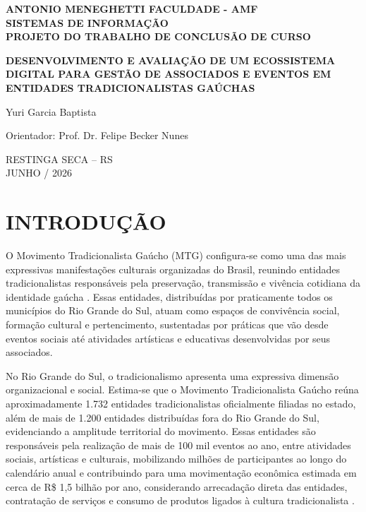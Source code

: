 ﻿\documentclass[12pt,a4paper]{article}
\begin{document}
\hypersetup{pageanchor=false}
\begin{titlepage}
    \begin{center}
        \textbf{ANTONIO MENEGHETTI FACULDADE - AMF}\\
        \textbf{SISTEMAS DE INFORMAÇÃO}\\
        \textbf{PROJETO DO TRABALHO DE CONCLUSÃO DE CURSO}

        \vfill

        \textbf{DESENVOLVIMENTO E AVALIAÇÃO DE UM ECOSSISTEMA DIGITAL PARA GESTÃO DE ASSOCIADOS E EVENTOS EM ENTIDADES TRADICIONALISTAS GAÚCHAS}

        \vfill

        Yuri Garcia Baptista

        \vfill

        Orientador: Prof. Dr. Felipe Becker Nunes

        \vfill

        RESTINGA SECA -- RS\\
        JUNHO / 2026
    \end{center}
\end{titlepage}
\hypersetup{pageanchor=true}

\section{INTRODUÇÃO}

O Movimento Tradicionalista Gaúcho (MTG) configura-se como uma das mais expressivas manifestações culturais organizadas do Brasil, reunindo entidades tradicionalistas responsáveis pela preservação, transmissão e vivência cotidiana da identidade gaúcha \citep{mtg2023,uliana2019}. Essas entidades, distribuídas por praticamente todos os municípios do Rio Grande do Sul, atuam como espaços de convivência social, formação cultural e pertencimento, sustentadas por práticas que vão desde eventos sociais até atividades artísticas e educativas desenvolvidas por seus associados.

No Rio Grande do Sul, o tradicionalismo apresenta uma expressiva dimensão organizacional e social. Estima-se que o Movimento Tradicionalista Gaúcho reúna aproximadamente 1.732 entidades tradicionalistas oficialmente filiadas no estado, além de mais de 1.200 entidades distribuídas fora do Rio Grande do Sul, evidenciando a amplitude territorial do movimento. Essas entidades são responsáveis pela realização de mais de 100 mil eventos ao ano, entre atividades sociais, artísticas e culturais, mobilizando milhões de participantes ao longo do calendário anual e contribuindo para uma movimentação econômica estimada em cerca de R\$ 1,5 bilhão por ano, considerando arrecadação direta das entidades, contratação de serviços e consumo de produtos ligados à cultura tradicionalista \citep{savaris2022}.
\end{document}
